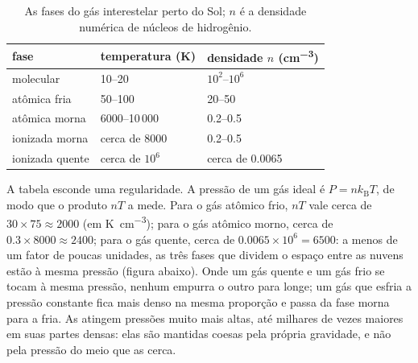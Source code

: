 \begin{table}[htbp]
\centering
\small
\begin{tabular}{lll}
\hline
fase & temperatura (K) & densidade $n$ (\unit{cm^{-3}}) \\
\hline
molecular & 10--20 & $10^2$--$10^6$ \\
atômica fria & 50--100 & 20--50 \\
atômica morna & 6000--10\,000 & 0.2--0.5 \\
ionizada morna & cerca de 8000 & 0.2--0.5 \\
ionizada quente & cerca de $10^6$ & cerca de 0.0065 \\
\hline
\end{tabular}
\caption{As fases do gás interestelar perto do Sol; $n$ é a densidade numérica
de núcleos de hidrogênio.}
\label{tab:b2:ism-star-formation:phases}
\end{table}

A tabela esconde uma regularidade. A pressão de um gás ideal é
$P = n k_{\mathrm B} T$, de modo que o produto $nT$ a mede. Para o gás atômico frio,
$nT$ vale cerca de $30\times75 \approx 2000$ (em \unit{K.cm^{-3}}); para o gás atômico
morno, cerca de $0.3\times8000 \approx 2400$; para o gás quente, cerca de
$0.0065\times10^6 = 6500$: a menos de um fator de poucas unidades, as três fases que
dividem o espaço entre as nuvens estão à mesma pressão (figura abaixo).
Onde um gás quente e um gás frio se tocam à mesma pressão, nenhum empurra o outro
para longe; um gás que esfria a pressão constante fica mais denso na mesma proporção e
passa da fase morna para a fria. As  atingem pressões muito mais altas, até milhares de vezes maiores em suas partes densas: elas são mantidas coesas pela própria gravidade, e não pela
pressão do meio que as cerca.

